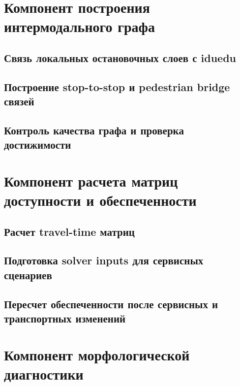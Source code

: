 \section{Компонент построения интермодального графа}
\label{sec:intermodal-graph-component}

\subsection{Связь локальных остановочных слоев с iduedu}
\label{subsec:iduedu-stops}

\subsection{Построение stop-to-stop и pedestrian bridge связей}
\label{subsec:stop-bridge-links}

\subsection{Контроль качества графа и проверка достижимости}
\label{subsec:graph-quality-control}

\section{Компонент расчета матриц доступности и обеспеченности}
\label{sec:accessibility-provision-component}

\subsection{Расчет travel-time матриц}
\label{subsec:travel-time-matrices}

\subsection{Подготовка solver inputs для сервисных сценариев}
\label{subsec:solver-inputs}

\subsection{Пересчет обеспеченности после сервисных и транспортных изменений}
\label{subsec:provision-recompute}

\section{Компонент морфологической диагностики}
\label{sec:morphology-diagnostics-component}

